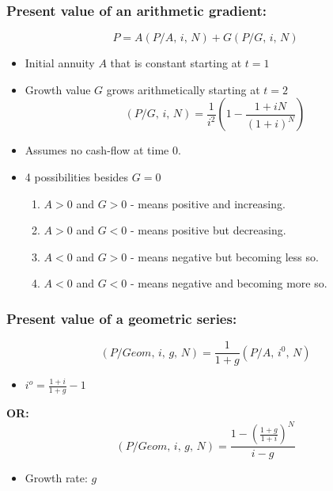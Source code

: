     \subsubsection{Present value of an arithmetic gradient:}
    \begin{definition}
        \begin{equation}
            P = A \left(P/A, \, i, \, N\right) + G \left(P/G, \, i, \, N\right)
        \end{equation}
        \begin{itemize}
            \item Initial annuity $A$ that is constant starting at $t=1$
            \item Growth value $G$ grows arithmetically starting at $t=2$
            \begin{equation*}
                \left(P/G, \, i, \, N\right) = \frac{1}{i^2} \left(1 - \frac{1 + iN}{(1+i)^N}\right)
            \end{equation*}
            \item Assumes no cash-flow at time $0$.
            \item 4 possibilities besides $G=0$
            \begin{enumerate}
                \item \( A > 0 \) and \( G > 0 \) - means positive and increasing.
                \item \( A > 0 \) and \( G < 0 \) - means positive but decreasing.
                \item \( A < 0 \) and \( G > 0 \) - means negative but becoming less so.
                \item \( A < 0 \) and \( G < 0 \) - means negative and becoming more so.
            \end{enumerate}
        \end{itemize}
    \end{definition}

    \subsubsection{Present value of a geometric series:}
    \begin{definition}
        \begin{equation}
            \left(P/Geom, \, i, \, g, \, N\right) = \frac{1}{1+g} \left(P/A, \, i^0, \, N\right)
        \end{equation}
        \begin{itemize}
            \item $i^o = \frac{1+i}{1+g} - 1$
        \end{itemize}
        \textbf{OR:}
        \begin{equation}
            \left(P/Geom, \, i, \, g, \, N\right) = \frac{1 - \left(\frac{1+g}{1+i}\right)^N}{i - g}
        \end{equation}
        \begin{itemize}
            \item Growth rate: $g$
        \end{itemize}
    \end{definition}

